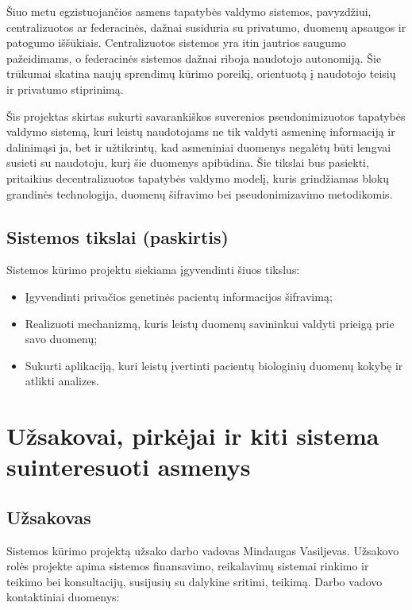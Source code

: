 \documentclass[12pt]{article}
\begin{document}
Šiuo metu egzistuojančios asmens tapatybės valdymo sistemos, pavyzdžiui,
centralizuotos ar federacinės, dažnai susiduria su privatumo, duomenų apsaugos
ir patogumo iššūkiais. Centralizuotos sistemos yra itin jautrios saugumo
pažeidimams, o federacinės sistemos dažnai riboja naudotojo autonomiją. Šie
trūkumai skatina naujų sprendimų kūrimo poreikį, orientuotą į naudotojo teisių
ir privatumo stiprinimą.

Šis projektas skirtas sukurti savarankiškos suverenios pseudonimizuotos
tapatybės valdymo sistemą, kuri leistų naudotojams
ne tik valdyti asmeninę informaciją ir dalinimąsi ja, bet ir užtikrintų, kad
asmeniniai duomenys negalėtų būti lengvai susieti su naudotoju, kurį šie
duomenys apibūdina. Šie tikslai bus pasiekti, pritaikius decentralizuotos
tapatybės valdymo modelį, kuris grindžiamas blokų grandinės technologija,
duomenų šifravimo bei pseudonimizavimo metodikomis.

\subsection{Sistemos tikslai (paskirtis)}
Sistemos kūrimo projektu siekiama įgyvendinti šiuos tikslus:
\begin{itemize}
    \item Įgyvendinti privačios genetinės pacientų informacijos šifravimą;
    \item Realizuoti mechanizmą, kuris leistų duomenų savininkui valdyti
    prieigą prie savo duomenų;
    \item Sukurti aplikaciją, kuri leistų įvertinti pacientų biologinių duomenų
    kokybę ir atlikti analizes.
\end{itemize}

\newpage

\section{Užsakovai, pirkėjai ir kiti sistema suinteresuoti asmenys}
\subsection{Užsakovas}
Sistemos kūrimo projektą užsako darbo vadovas Mindaugas Vasiljevas. Užsakovo
rolės projekte apima sistemos finansavimo, reikalavimų sistemai rinkimo ir
teikimo bei konsultacijų, susijusių su dalykine sritimi, teikimą.
Darbo vadovo kontaktiniai duomenys:
\end{document}
